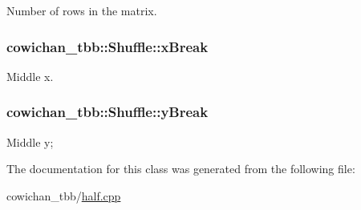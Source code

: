 Number of rows in the matrix. \hypertarget{classcowichan__tbb_1_1_shuffle_a592c8516247d32fe1d29da5a5702522}{
\subsubsection[{xBreak}]{ {\bf cowichan\_\-tbb::Shuffle::xBreak}}}
\label{classcowichan__tbb_1_1_shuffle_a592c8516247d32fe1d29da5a5702522}


Middle x. \hypertarget{classcowichan__tbb_1_1_shuffle_61e454d5681e079269c80786e53600c4}{
\subsubsection[{yBreak}]{ {\bf cowichan\_\-tbb::Shuffle::yBreak}}}
\label{classcowichan__tbb_1_1_shuffle_61e454d5681e079269c80786e53600c4}


Middle y; 

The documentation for this class was generated from the following file:\begin{CompactItemize}
\item 
cowichan\_\-tbb/\hyperlink{cowichan__tbb_2half_8cpp}{half.cpp}\end{CompactItemize}
